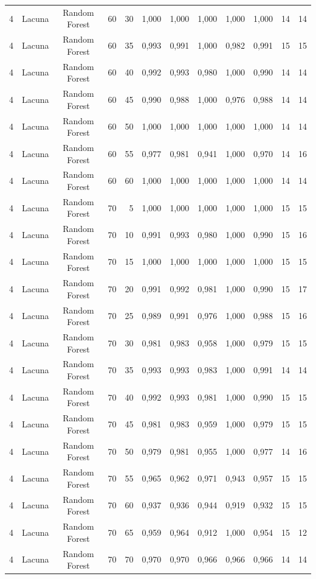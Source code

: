 \begin{longtable}{ccclrrrrrrrr}
4 & Lacuna & Random Forest & 60 & 30 & 1,000 & 1,000 & 1,000 & 1,000 & 1,000 & 14 & 14 \\
4 & Lacuna & Random Forest & 60 & 35 & 0,993 & 0,991 & 1,000 & 0,982 & 0,991 & 15 & 15 \\
4 & Lacuna & Random Forest & 60 & 40 & 0,992 & 0,993 & 0,980 & 1,000 & 0,990 & 14 & 14 \\
4 & Lacuna & Random Forest & 60 & 45 & 0,990 & 0,988 & 1,000 & 0,976 & 0,988 & 14 & 14 \\
4 & Lacuna & Random Forest & 60 & 50 & 1,000 & 1,000 & 1,000 & 1,000 & 1,000 & 14 & 14 \\
4 & Lacuna & Random Forest & 60 & 55 & 0,977 & 0,981 & 0,941 & 1,000 & 0,970 & 14 & 16 \\
4 & Lacuna & Random Forest & 60 & 60 & 1,000 & 1,000 & 1,000 & 1,000 & 1,000 & 14 & 14 \\
4 & Lacuna & Random Forest & 70 & 5 & 1,000 & 1,000 & 1,000 & 1,000 & 1,000 & 15 & 15 \\
4 & Lacuna & Random Forest & 70 & 10 & 0,991 & 0,993 & 0,980 & 1,000 & 0,990 & 15 & 16 \\
4 & Lacuna & Random Forest & 70 & 15 & 1,000 & 1,000 & 1,000 & 1,000 & 1,000 & 15 & 15 \\
4 & Lacuna & Random Forest & 70 & 20 & 0,991 & 0,992 & 0,981 & 1,000 & 0,990 & 15 & 17 \\
4 & Lacuna & Random Forest & 70 & 25 & 0,989 & 0,991 & 0,976 & 1,000 & 0,988 & 15 & 16 \\
4 & Lacuna & Random Forest & 70 & 30 & 0,981 & 0,983 & 0,958 & 1,000 & 0,979 & 15 & 15 \\
4 & Lacuna & Random Forest & 70 & 35 & 0,993 & 0,993 & 0,983 & 1,000 & 0,991 & 14 & 14 \\
4 & Lacuna & Random Forest & 70 & 40 & 0,992 & 0,993 & 0,981 & 1,000 & 0,990 & 15 & 15 \\
4 & Lacuna & Random Forest & 70 & 45 & 0,981 & 0,983 & 0,959 & 1,000 & 0,979 & 15 & 15 \\
4 & Lacuna & Random Forest & 70 & 50 & 0,979 & 0,981 & 0,955 & 1,000 & 0,977 & 14 & 16 \\
4 & Lacuna & Random Forest & 70 & 55 & 0,965 & 0,962 & 0,971 & 0,943 & 0,957 & 15 & 15 \\
4 & Lacuna & Random Forest & 70 & 60 & 0,937 & 0,936 & 0,944 & 0,919 & 0,932 & 15 & 15 \\
4 & Lacuna & Random Forest & 70 & 65 & 0,959 & 0,964 & 0,912 & 1,000 & 0,954 & 15 & 12 \\
4 & Lacuna & Random Forest & 70 & 70 & 0,970 & 0,970 & 0,966 & 0,966 & 0,966 & 14 & 14 \\

\end{longtable}
